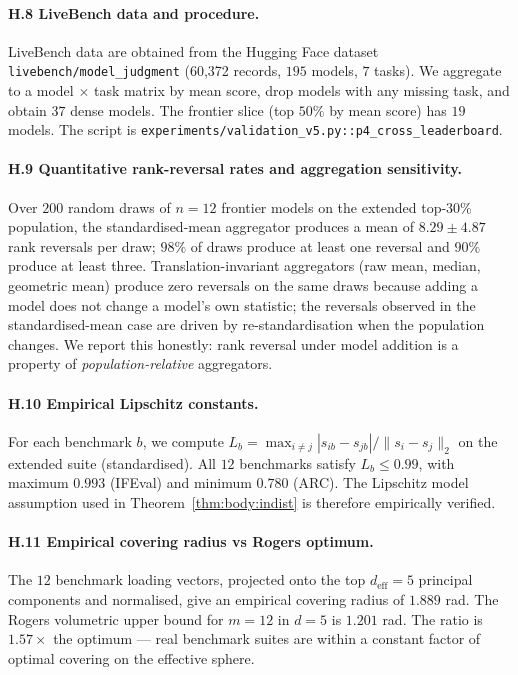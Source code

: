 \documentclass{article}
\begin{document}
\paragraph{H.8 LiveBench data and procedure.}
LiveBench data are obtained from the Hugging Face dataset
\texttt{livebench/model\_judgment} (60{,}372 records, $195$ models,
$7$ tasks). We aggregate to a model$\,\times\,$task matrix by mean
score, drop models with any missing task, and obtain $37$ dense
models. The frontier slice (top $50\%$ by mean score) has $19$
models. The script is
\texttt{experiments/validation\_v5.py::p4\_cross\_leaderboard}.

\paragraph{H.9 Quantitative rank-reversal rates and aggregation
sensitivity.} Over $200$ random draws of $n = 12$ frontier models on
the extended top-$30\%$ population, the standardised-mean aggregator
produces a mean of $8.29 \pm 4.87$ rank reversals per draw; $98\%$
of draws produce at least one reversal and $90\%$ produce at least
three. Translation-invariant aggregators (raw mean, median,
geometric mean) produce zero reversals on the same draws because
adding a model does not change a model's own statistic; the
reversals observed in the standardised-mean case are driven by
re-standardisation when the population changes. We report this
honestly: rank reversal under model addition is a property of
\emph{population-relative} aggregators.

\paragraph{H.10 Empirical Lipschitz constants.}
For each benchmark $b$, we compute
$L_b = \max_{i \neq j} |s_{ib} - s_{jb}| / \|s_i - s_j\|_2$ on the
extended suite (standardised). All $12$ benchmarks satisfy
$L_b \le 0.99$, with maximum $0.993$ (IFEval) and minimum $0.780$
(ARC). The Lipschitz model assumption used in
Theorem~\ref{thm:body:indist} is therefore empirically verified.

\paragraph{H.11 Empirical covering radius vs Rogers optimum.}
The $12$ benchmark loading vectors, projected onto the top
$d_{\mathrm{eff}} = 5$ principal components and normalised, give an
empirical covering radius of $1.889$ rad. The Rogers volumetric
upper bound for $m = 12$ in $d = 5$ is $1.201$ rad. The ratio is
$1.57\times$ the optimum --- real benchmark suites are within a
constant factor of optimal covering on the effective sphere.
\end{document}
